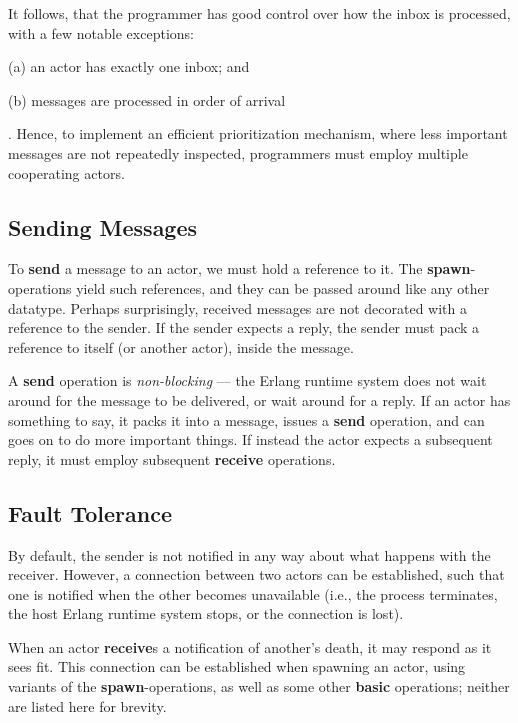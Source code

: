 It follows, that the programmer has good control over how the inbox is
processed, with a few notable exceptions: \begin{inparaenum}\item[(a)]
an actor has exactly one inbox; and \item[(b)] messages are processed
in order of arrival\end{inparaenum}.  Hence, to implement an efficient
prioritization mechanism, where less important messages are not
repeatedly inspected, programmers must employ multiple cooperating
actors.

\subsection{Sending Messages}

To \textbf{send} a message to an actor, we must hold a reference to it.
The \textbf{spawn}-operations yield such references, and they can be
passed around like any other datatype. Perhaps surprisingly, received
messages are not decorated with a reference to the sender. If the
sender expects a reply, the sender must pack a reference to itself (or
another actor), inside the message.

A \textbf{send} operation is \emph{non-blocking} --- the Erlang
runtime system does not wait around for the message to be delivered,
or wait around for a reply. If an actor has something to say, it packs
it into a message, issues a \textbf{send} operation, and can goes on
to do more important things. If instead the actor expects a subsequent
reply, it must employ subsequent \textbf{receive} operations.

\subsection{Fault Tolerance}

By default, the sender is not notified in any way about what happens
with the receiver. However, a connection between two actors can be
established, such that one is notified when the other becomes
unavailable (i.e., the process terminates, the host Erlang runtime
system stops, or the connection is lost).

When an actor \textbf{receive}s a notification of another's death, it
may respond as it sees fit. This connection can be established when
spawning an actor, using variants of the \textbf{spawn}-operations, as
well as some other \textbf{basic} operations; neither are listed here
for brevity.

